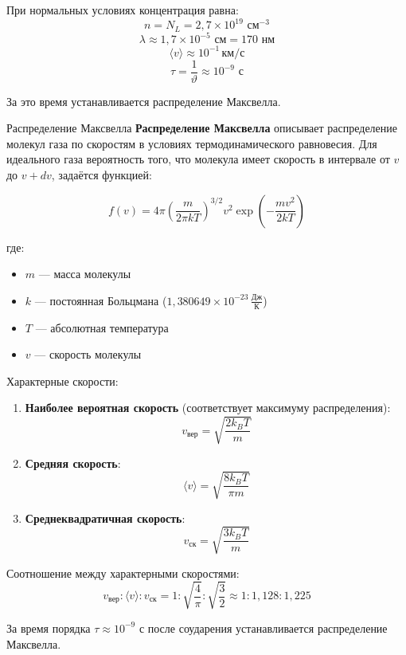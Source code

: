 При нормальных условиях концентрация равна:
\[
n = N_L = 2,\!7 \times 10^{19} \text{ см}^{-3}
\]
\[
\lambda \approx 1,\!7 \times 10^{-5} \text{ см} = 170 \text{ нм}
\]
\[
\langle v \rangle \approx 10^{-1} \, \text{км/с}
\]
\[
\tau = \frac{1}{\vartheta} \approx 10^{-9} \text{ с}
\]

За это время устанавливается распределение Максвелла.

\begin{tbox}{Распределение Максвелла}
	\textbf{Распределение Максвелла} описывает распределение молекул газа по скоростям в условиях термодинамического равновесия. Для идеального газа вероятность того, что молекула имеет скорость в интервале от $v$ до $v+dv$, задаётся функцией:

	\[
	f(v) = 4\pi \left(\frac{m}{2\pi k T}\right)^{3/2} v^2 \exp\left(-\frac{mv^2}{2k T}\right)
	\]

	где:
	\begin{itemize}
		\item $m$ — масса молекулы
		\item $k$ — постоянная Больцмана ($1,380649 \times 10^{-23} \, \frac{\text{Дж}}{\text{К}}$)
		\item $T$ — абсолютная температура
		\item $v$ — скорость молекулы
	\end{itemize}

	Характерные скорости:
	\begin{enumerate}
		\item \textbf{Наиболее вероятная скорость} (соответствует максимуму распределения):
		\[
		v_{\text{вер}} = \sqrt{\frac{2k_B T}{m}}
		\]

		\item \textbf{Средняя скорость}:
		\[
		\langle v \rangle = \sqrt{\frac{8k_B T}{\pi m}}
		\]

		\item \textbf{Среднеквадратичная скорость}:
		\[
		v_{\text{ск}} = \sqrt{\frac{3k_B T}{m}}
		\]
	\end{enumerate}

	Соотношение между характерными скоростями:
	\[
	v_{\text{вер}} : \langle v \rangle : v_{\text{ск}} = 1 : \sqrt{\frac{4}{\pi}} : \sqrt{\frac{3}{2}} \approx 1 : 1,128 : 1,225
	\]

	За время порядка $\tau \approx 10^{-9}$ с после соударения устанавливается распределение Максвелла.
\end{tbox}